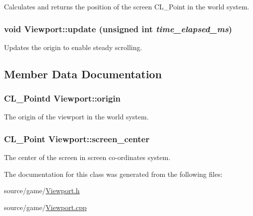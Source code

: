 \label{classViewport_a73064b60005187e3762f16618298e651}
Calculates and returns the position of the screen CL\_\-Point in the world system. \hypertarget{classViewport_ad6b4c3ce84e139598414bb61c4802e17}{
\subsubsection[{update}]{\setlength{\rightskip}{0pt plus 5cm}void Viewport::update (unsigned int {\em time\_\-elapsed\_\-ms})}}
\label{classViewport_ad6b4c3ce84e139598414bb61c4802e17}
Updates the origin to enable steady scrolling. 

\subsection{Member Data Documentation}
\hypertarget{classViewport_ac1415e2e5f8ccad7e50dc834126439fa}{
\subsubsection[{origin}]{\setlength{\rightskip}{0pt plus 5cm}CL\_\-Pointd {\bf Viewport::origin}}}
\label{classViewport_ac1415e2e5f8ccad7e50dc834126439fa}
The origin of the viewport in the world system. \hypertarget{classViewport_ada6d3facef528063b5204a530f8b30bf}{
\subsubsection[{screen\_\-center}]{\setlength{\rightskip}{0pt plus 5cm}CL\_\-Point {\bf Viewport::screen\_\-center}}}
\label{classViewport_ada6d3facef528063b5204a530f8b30bf}
The center of the screen in screen co-\/ordinates system. 

The documentation for this class was generated from the following files:\begin{DoxyCompactItemize}
\item 
source/game/\hyperlink{Viewport_8h}{Viewport.h}\item 
source/game/\hyperlink{Viewport_8cpp}{Viewport.cpp}\end{DoxyCompactItemize}
